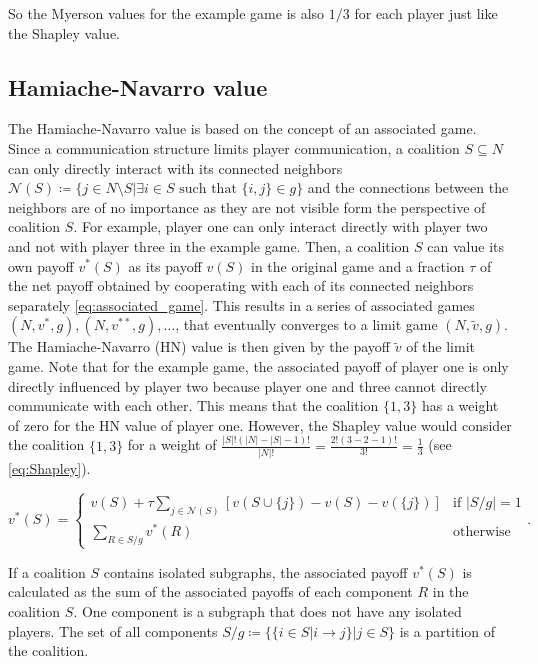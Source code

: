 So the Myerson values for the example game is also $1/3$ for each player just 
like the Shapley value.


\subsection{Hamiache-Navarro value}


The Hamiache-Navarro value is based on the concept of an associated game.
Since a communication structure limits player communication, a coalition 
$S \subseteq N$ can only directly interact with its connected neighbors 
$\mathcal{N}(S) \coloneqq \{ j \in N \setminus S | \exists i \in S \text{ such that } \{i, j\} \in g \}$
and the connections between the neighbors are of no importance as they are not 
visible form the perspective of coalition $S$. 
For example, player one can only interact directly with player two and not with player three
in the example game.
Then, a coalition $S$ can value its own payoff $v^*(S)$ as its payoff $v(S)$ in the original game and a fraction 
$\tau$ of the net payoff obtained by cooperating with each of its connected 
neighbors separately \cref{eq:associated_game}.\cite{hamiache2001associated}
This results in a series of associated games $(N, v^*, g), (N, v^{**}, g), \dots$, 
that eventually converges to a limit game $(N, \tilde{v}, g)$. The Hamiache-Navarro 
(HN) value is then given by the payoff $\tilde{v}$ of the limit game. Note that for 
the example game, the associated payoff of player one is only directly influenced 
by player two because player one and three cannot directly communicate 
with each other. This means that the coalition $\{1, 3\}$ has a weight of zero for the 
HN value of player one. However, the Shapley value would consider the coalition 
$\{1, 3\}$ for a weight of
$\frac{|S|! ( |N| - |S| - 1)!}{|N|!} = \frac{2! (3 - 2 - 1)!}{3!} = \frac{1}{3}$ (see \cref{eq:Shapley}).


\begin{equation}
	\label{eq:associated_game}
	v^*(S) =
	\begin{cases}
		\displaystyle
        v(S) + \tau \sum_{j \in \mathcal{N}(S)} \left[ v(S \cup \{j\}) - v(S) - v(\{j\}) \right] & \text{if } |S/g| = 1 \\
		\displaystyle
		\sum_{R \in S/g} v^*(R)                                                                   & \text{otherwise}
	\end{cases}
	.
\end{equation}


If a coalition $S$ contains isolated subgraphs, the associated payoff $v^*(S)$ 
is calculated as the sum of the associated payoffs of each component $R$ in the 
coalition $S$. One component is a subgraph that does not have any isolated players. 
The set of all components $S/g \coloneqq \{\{ i \in S| i \rightarrow j\} | j \in S\}$ 
is a partition of the coalition.



